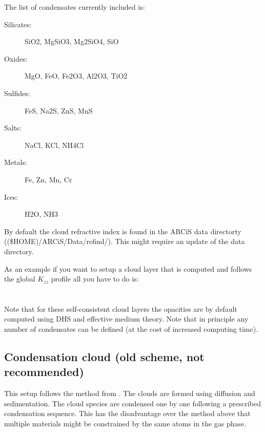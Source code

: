 \documentclass[12pt]{article}
\begin{document}
The list of condensates currently included is:
\begin{description}
\item[Silicates:] SiO2, MgSiO3, Mg2SiO4, SiO
\item[Oxides:] MgO, FeO, Fe2O3, Al2O3, TiO2
\item[Sulfides:] FeS, Na2S, ZnS, MnS
\item[Salts:] NaCl, KCl, NH4Cl
\item[Metals:] Fe, Zn, Mn, Cr
\item[Ices:] H2O, NH3
\end{description}

By default the cloud refractive index is found in the ARCiS data directorty ((\$HOME)/ARCiS/Data/refind/). This might require an update of the data directory.

As an example if you want to setup a cloud layer that is computed and follows the global $K_{zz}$ profile all you have to do is:
\\
\\
\\
Note that for these self-consistent cloud layers the opacities are by default computed using DHS and effective medium theory. Note that in principle any number of condensates can be defined (at the cost of increased computing time).

\subsection{Condensation cloud (old scheme, not recommended)}

This setup follows the method from \cite{2019A&A...622A.121O}. The clouds are formed using diffusion and sedimentation. The cloud species are condensed one by one following a prescribed condensation sequence. This has the disadvantage over the method above that multiple materials might be constrained by the same atoms in the gas phase.
\end{document}
